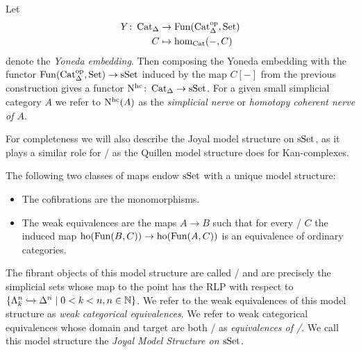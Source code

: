 \begin{definition} %
    Let
    \begin{align*}
        Y\colon\operatorname{Cat}_{\Delta}&\to\operatorname{Fun}(\operatorname{Cat}_{\Delta}^{\operatorname{op}},\operatorname{Set})\\
        C&\mapsto\hom_{\operatorname{Cat}}(-,C)
    \end{align*}
    denote the \emph{Yoneda embedding}.
    Then composing the Yoneda embedding with the functor $\operatorname{Fun}(\operatorname{Cat}_{\Delta}^{\operatorname{op}},\operatorname{Set})\to\operatorname{sSet}$ induced by the map $C[-]$ from the previous construction gives a functor $\operatorname{N^{hc}}\colon\operatorname{Cat}_{\Delta}\to\operatorname{sSet}$.
    For a given small simplicial category $A$ we refer to $\operatorname{N^{hc}}(A)$ as the \emph{simplicial nerve} or \emph{homotopy coherent nerve of $A$}.
\end{definition}
For completeness we will also describe the Joyal model structure on $\operatorname{sSet}$, as it plays a similar role for \inftycats/ as the Quillen model structure does for Kan-complexes.
\begin{thm}
    The following two classes of maps endow $\operatorname{sSet}$ with a unique model structure:
    \begin{itemize}
        \item The cofibrations are the monomorphisms.
        \item The weak equivalences are the maps $A\to B$ such that for every \inftycat/ $C$ the induced map $\operatorname{ho}(\operatorname{Fun}(B,C))\to\operatorname{ho}(\operatorname{Fun}(A,C))$ is an equivalence of ordinary categories.
    \end{itemize}
    The fibrant objects of this model structure are called \inftycats/ and are precisely the simplicial sets whose map to the point has the RLP with respect to $\left\lbrace\Lambda_k^n\xhookrightarrow{}\Delta^n\mid 0< k< n, n\in\mathbb{N}\right\rbrace$.
    We refer to the weak equivalences of this model structure as \emph{weak categorical equivalences}.
    We refer to weak categorical equivalences whose domain and target are both \inftycats/ as \emph{equivalences of \inftycats/}.
    We call this model structure the \emph{Joyal Model Structure on $\operatorname{sSet}$}.
    \begin{reference}
        \cite[Definition 3.3.7, Theorem 3.6.8 and Theorem 3.6.1]{cisinski_2019}
    \end{reference}
\end{thm}
